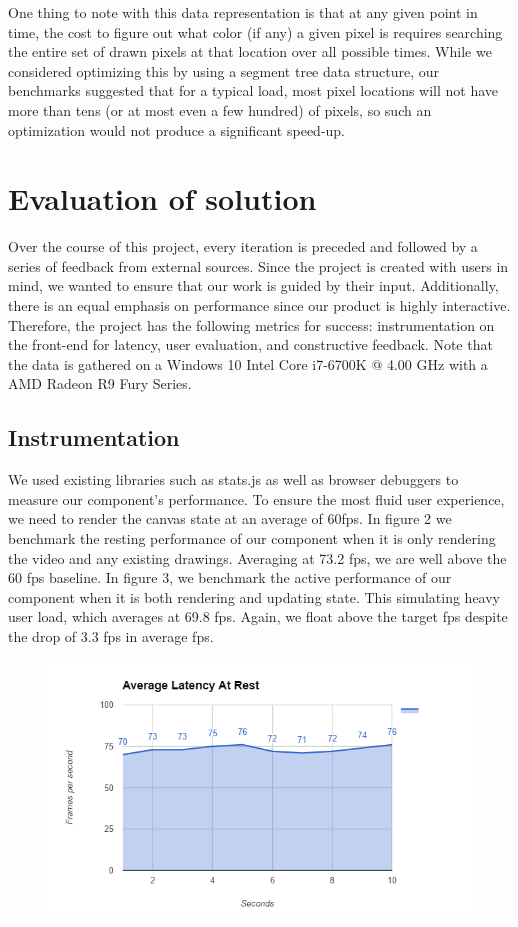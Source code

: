 \documentclass[conference]{IEEEtran}
\begin{document}
    One thing to note with this data representation is that at any given point in time, the cost to figure out what color (if any) a given pixel is requires searching the entire set of drawn pixels at that location over all possible times. While we considered optimizing this by using a segment tree data structure, our benchmarks suggested that for a typical load, most pixel locations will not have more than tens (or at most even a few hundred) of pixels, so such an optimization would not produce a significant speed-up.

\section{Evaluation of solution}
    Over the course of this project, every iteration is preceded and followed by a series of feedback from external sources. Since the project is created with users in mind, we wanted to ensure that our work is guided by their input. Additionally, there is an equal emphasis on performance since our product is highly interactive. Therefore, the project has the following metrics for success: instrumentation on the front-end for latency, user evaluation, and constructive feedback. Note that the data is gathered on a Windows 10 Intel Core i7-6700K @ 4.00 GHz with a AMD Radeon R9 Fury Series.



\subsection{Instrumentation}
    We used existing libraries such as stats.js \cite{statsjs} as well as browser debuggers to measure our component's performance. To ensure the most fluid user experience, we need to render the canvas state at an average of 60fps. In figure 2 we benchmark the resting performance of our component when it is only rendering the video and any existing drawings. Averaging at 73.2 fps, we are well above the 60 fps baseline. In figure 3, we benchmark the active performance of our component when it is both rendering and updating state. This simulating heavy user load, which averages at 69.8 fps. Again, we float above the target fps despite the drop of 3.3 fps in average fps.

    \begin{figure}[H]
      \centering
      \includegraphics[width=\linewidth]{figure2a.PNG}
      \caption{}
      \label{fig:my_label}
    \end{figure}
\end{document}
